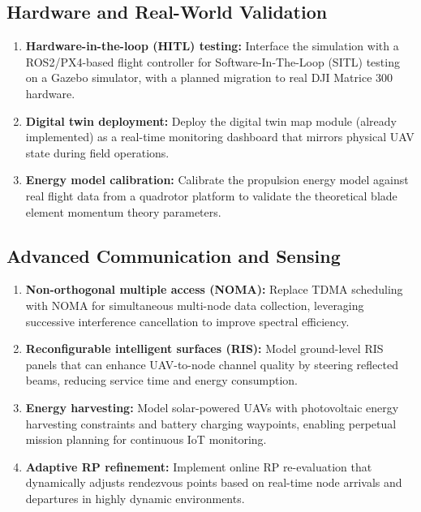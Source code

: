 \documentclass[12pt, a4paper, oneside]{report}
\begin{document}
\subsection{Hardware and Real-World Validation}

\begin{enumerate}
    \item \textbf{Hardware-in-the-loop (HITL) testing:} Interface the simulation with a ROS2/PX4-based flight controller for Software-In-The-Loop (SITL) testing on a Gazebo simulator, with a planned migration to real DJI Matrice 300 hardware.

    \item \textbf{Digital twin deployment:} Deploy the digital twin map module (already implemented) as a real-time monitoring dashboard that mirrors physical UAV state during field operations.

    \item \textbf{Energy model calibration:} Calibrate the propulsion energy model against real flight data from a quadrotor platform to validate the theoretical blade element momentum theory parameters.
\end{enumerate}

\subsection{Advanced Communication and Sensing}

\begin{enumerate}
    \item \textbf{Non-orthogonal multiple access (NOMA):} Replace TDMA scheduling with NOMA for simultaneous multi-node data collection, leveraging successive interference cancellation to improve spectral efficiency.

    \item \textbf{Reconfigurable intelligent surfaces (RIS):} Model ground-level RIS panels that can enhance UAV-to-node channel quality by steering reflected beams, reducing service time and energy consumption.

    \item \textbf{Energy harvesting:} Model solar-powered UAVs with photovoltaic energy harvesting constraints and battery charging waypoints, enabling perpetual mission planning for continuous IoT monitoring.

    \item \textbf{Adaptive RP refinement:} Implement online RP re-evaluation that dynamically adjusts rendezvous points based on real-time node arrivals and departures in highly dynamic environments.
\end{enumerate}
\end{document}
